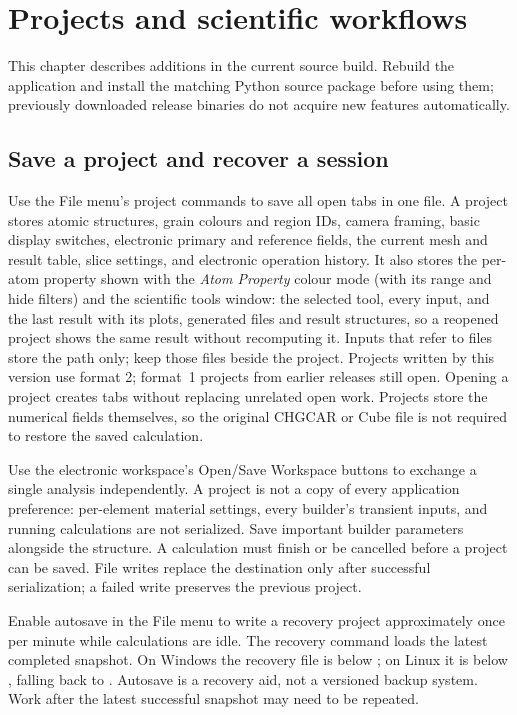 \chapter{Projects and scientific workflows}\label{ch:workflows}
This chapter describes additions in the current source build. Rebuild the application and install the matching Python source package before using them; previously downloaded release binaries do not acquire new features automatically.

\section{Save a project and recover a session}
Use the File menu's project commands to save all open tabs in one  file. A project stores atomic structures, grain colours and region IDs, camera framing, basic display switches, electronic primary and reference fields, the current mesh and result table, slice settings, and electronic operation history. It also stores the per-atom property shown with the \emph{Atom Property} colour mode (with its range and hide filters) and the scientific tools window: the selected tool, every input, and the last result with its plots, generated files and result structures, so a reopened project shows the same result without recomputing it. Inputs that refer to files store the path only; keep those files beside the project. Projects written by this version use format 2; format~1 projects from earlier releases still open. Opening a project creates tabs without replacing unrelated open work. Projects store the numerical fields themselves, so the original CHGCAR or Cube file is not required to restore the saved calculation.

Use the electronic workspace's Open/Save Workspace buttons to exchange a single analysis independently. A project is not a copy of every application preference: per-element material settings, every builder's transient inputs, and running calculations are not serialized. Save important builder parameters alongside the structure. A calculation must finish or be cancelled before a project can be saved. File writes replace the destination only after successful serialization; a failed write preserves the previous project.

Enable autosave in the File menu to write a recovery project approximately once per minute while calculations are idle. The recovery command loads the latest completed snapshot. On Windows the recovery file is below ; on Linux it is below , falling back to . Autosave is a recovery aid, not a versioned backup system. Work after the latest successful snapshot may need to be repeated.

